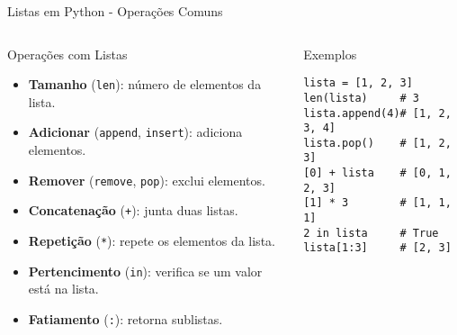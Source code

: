 \begin{frame}[fragile]{Listas em Python - Operações Comuns}

\begin{columns}[T]
    \begin{block}{Operações com Listas}
        \begin{itemize}
            \item \textbf{Tamanho} (\texttt{len}): número de elementos da lista.
            \item \textbf{Adicionar} (\texttt{append}, \texttt{insert}): adiciona elementos.
            \item \textbf{Remover} (\texttt{remove}, \texttt{pop}): exclui elementos.
            \item \textbf{Concatenação} (\texttt{+}): junta duas listas.
            \item \textbf{Repetição} (\texttt{*}): repete os elementos da lista.
            \item \textbf{Pertencimento} (\texttt{in}): verifica se um valor está na lista.
            \item \textbf{Fatiamento} (\texttt{:}): retorna sublistas.
        \end{itemize}
    \end{block}

    \begin{block}{Exemplos}
\begin{verbatim}
lista = [1, 2, 3]
len(lista)     # 3
lista.append(4)# [1, 2, 3, 4]
lista.pop()    # [1, 2, 3]
[0] + lista    # [0, 1, 2, 3]
[1] * 3        # [1, 1, 1]
2 in lista     # True
lista[1:3]     # [2, 3]
\end{verbatim}
    \end{block}
\end{columns}

\end{frame}


